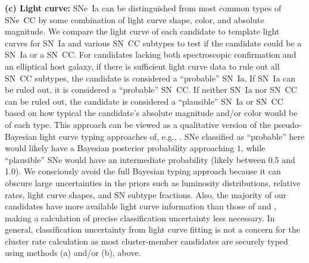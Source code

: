 

{\bf (c) Light curve:} SNe~Ia can be distinguished from most common
types of SNe~CC by some combination of light curve shape, color, and
absolute magnitude.  We compare the light curve of each candidate to
template light curves for SN~Ia and various SN~CC subtypes to test if
the candidate could be a SN~Ia or a SN~CC. For candidates lacking
both spectroscopic confirmation and an elliptical host galaxy, if
there is sufficient light curve data to rule out all SN~CC subtypes,
the candidate is considered a ``probable'' SN~Ia. If SN~Ia can be
ruled out, it is considered a ``probable'' SN~CC. If neither SN~Ia nor
SN~CC can be ruled out, the candidate is considered a ``plausible''
SN~Ia or SN~CC based on how typical the candidate's absolute magnitude
and/or color would be of each type. This approach can be viewed as a
qualitative version of the pseudo-Bayesian light curve typing
approaches of,
e.g., \citet{kuznetsova07a,kuznetsova08a,poznanski07b,poznanski07a}. SNe
classified as ``probable'' here would likely have a Bayesian posterior
probability approaching $1$, while ``plausible'' SNe would have an
intermediate probability (likely between 0.5 and 1.0). We consciously
avoid the full Bayesian typing approach because it can obscure large
uncertainties in the priors such as luminosity distributions, relative
rates, light curve shapes, and SN subtype fractions. Also, the
majority of our candidates have more available light curve information
than those of \citet{kuznetsova08a} and \citet{poznanski07a}, making a
calculation of precise classification uncertainty less necessary. In
general, classification uncertainty from light curve fitting is not a
concern for the cluster rate calculation as most cluster-member
candidates are securely typed using methods (a) and/or (b), above.

